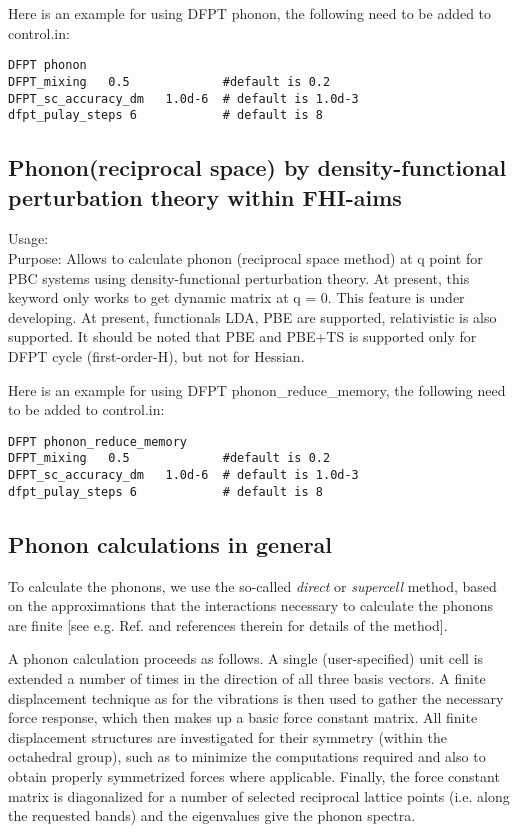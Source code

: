 Here is an example for using DFPT phonon,  the following need to be added to control.in:
\begin{verbatim} 
DFPT phonon
DFPT_mixing   0.5             #default is 0.2
DFPT_sc_accuracy_dm   1.0d-6  # default is 1.0d-3
dfpt_pulay_steps 6            # default is 8
\end{verbatim}  
  

\subsection*{Phonon(reciprocal space) by density-functional perturbation theory within FHI-aims}
{
Usage:  \\[1.0em]
  Purpose: Allows to calculate phonon (reciprocal space method) at q point for PBC systems using density-functional perturbation theory. At present, this keyword only works to get dynamic matrix at q = 0.  This feature is under developing. At present, functionals LDA, PBE are supported, relativistic is also supported. It should be noted that PBE and PBE+TS is supported only for DFPT cycle (first-order-H), but not for Hessian.\\}

Here is an example for using DFPT phonon\_reduce\_memory,  the following need to be added to control.in:
\begin{verbatim} 
DFPT phonon_reduce_memory
DFPT_mixing   0.5             #default is 0.2
DFPT_sc_accuracy_dm   1.0d-6  # default is 1.0d-3
dfpt_pulay_steps 6            # default is 8
\end{verbatim}  



\subsection*{Phonon calculations in general}

To calculate the phonons, we use the so-called
\emph{direct} or \emph{supercell} method, based on the approximations
that the interactions necessary to calculate the phonons are
finite [see e.g. Ref. \cite{Parlinski97} and references therein
for details of the method]. 

A phonon calculation proceeds as follows. A single (user-specified)
unit cell is extended a number of times in the direction of all three
basis vectors. A finite displacement technique as for the vibrations is then
used to gather the necessary force response, which then makes up a
basic force constant matrix. All finite displacement structures are
investigated for their symmetry (within the octahedral group), such as
to minimize the computations required and also to obtain properly
symmetrized forces where applicable. Finally, the force constant matrix is
diagonalized for a number of selected reciprocal lattice points
(i.e. along the requested bands) and the eigenvalues give the phonon
spectra. 

